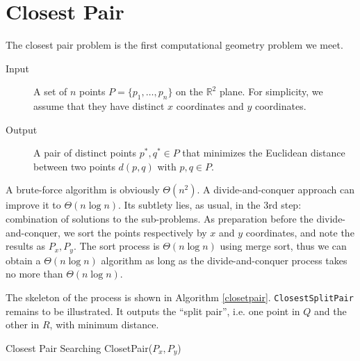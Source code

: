\section{Closest Pair}
The closest pair problem is the first computational geometry problem we meet. 
\begin{description}
\item[Input]A set of $n$ points $P=\{p_1,\dots,p_n\}$ on the $\mathbb{R}^2$ plane. For simplicity, we assume that they have distinct $x$ coordinates and $y$ coordinates.
\item[Output]A pair of distinct points $p^*,q^*\in P$ that minimizes the Euclidean distance between two points $d(p,q)$ with $p,q\in P$.
\end{description}
A brute-force algorithm is obviously $\Theta(n^2)$. A divide-and-conquer approach can improve it to $\Theta(n\log n)$. Its subtlety lies, as usual, in the 3rd step: combination of solutions to the sub-problems. As preparation before the divide-and-conquer, we sort the points respectively by $x$ and $y$ coordinates, and note the results as $P_x,P_y$. The sort process is $\Theta(n\log n)$ using merge sort, thus we can obtain a $\Theta(n \log n)$ algorithm as long as the divide-and-conquer process takes no more than $\Theta(n\log n)$. 

The skeleton of the process is shown in Algorithm \ref{closetpair}. \texttt{ClosestSplitPair} remains to be illustrated. It outputs the ``split pair'', i.e. one point in $Q$ and the other in $R$, with minimum distance.
\begin{algorithm}[ht]
\caption{Closest Pair Searching ClosetPair($P_x,P_y$)}\label{closetpair}
\begin{algorithmic}[1]
\Input{}
\Output{}
\end{algorithmic}
\end{algorithm}

